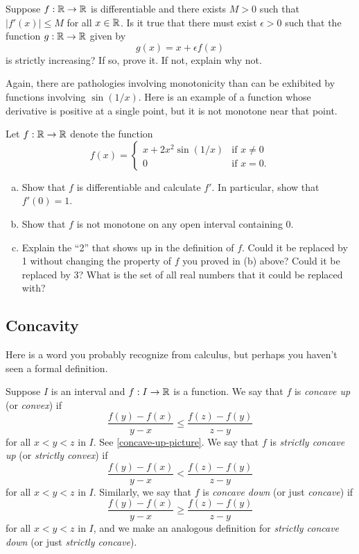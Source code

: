 \begin{exercise}
	Suppose $f : \mathbb{R} \to \mathbb{R}$ is differentiable and there exists $M > 0$ such that $|f'(x)| \leq M$ for all $x \in \mathbb{R}$. Is it true that there must exist $\epsilon >  0$ such that the function $g : \mathbb{R} \to \mathbb{R}$ given by \[ g(x) = x + \epsilon f(x) \]
	is strictly increasing? If so, prove it. If not, explain why not. 
\end{exercise}

Again, there are pathologies involving monotonicity than can be exhibited by functions involving $\sin(1/x)$. Here is an example of a function whose derivative is positive at a single point, but it is not monotone near that point. 

\begin{exercise} \label{positive-not-monotone}
	Let $f : \mathbb{R} \to \mathbb{R}$ denote the function
	\[ f(x) = \begin{cases} x + 2x^2 \sin(1/x) & \text{if } x \neq 0 \\ 0 & \text{if } x = 0. \end{cases} \]
	\begin{enumerate}[(a)]
		\item Show that $f$ is differentiable and calculate $f'$. In particular, show that $f'(0) = 1$. 
		\item Show that $f$ is not monotone on any open interval containing 0.  
		\item Explain the ``2'' that shows up in the definition of $f$. Could it be replaced by 1 without changing the property of $f$ you proved in (b) above? Could it be replaced by 3? What is the set of all real numbers that it could be replaced with?
	\end{enumerate}
\end{exercise}

\subsection{Concavity}

Here is a word you probably recognize from calculus, but perhaps you haven't seen a formal definition. 

\begin{definition} \label{concave-up-definition}
	Suppose $I$ is an interval and $f : I \to \mathbb{R}$ is a function. We say that $f$ is \emph{concave up} (or \emph{convex}) if
	\[ \frac{f(y)-f(x)}{y-x} \leq \frac{f(z)-f(y)}{z-y} \]
	for all $x < y < z$ in $I$. 
	See \cref{concave-up-picture}. We say that $f$ is \emph{strictly concave up} (or \emph{strictly convex}) if 
	\[ \frac{f(y)-f(x)}{y-x} < \frac{f(z)-f(y)}{z-y} \]
	for all $x < y < z$ in $I$. 
	Similarly, we say that $f$ is \emph{concave down} (or just \emph{concave}) if
	\[ \frac{f(y)-f(x)}{y-x} \geq \frac{f(z)-f(y)}{z-y} \]
	for all $x < y < z$ in $I$, and we make an analogous definition for \emph{strictly concave down} (or just \emph{strictly concave}). 
\end{definition}

